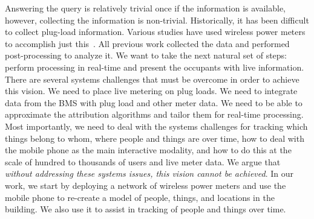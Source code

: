 Answering the query is relatively trivial once if the information is available, however, collecting the information
is non-trivial.  Historically, it has been difficult to collect plug-load information.
Various studies have used wireless power meters to accomplish just this~\cite{stephscale, lanz, aceee}.
All previous work collected the data and performed post-processing to analyze it.  We want to take the next
natural set of steps: perform processing in real-time and present the occupants with live information.  
There are several systems challenges that must be overcome in order to achieve this vision.  We need to 
place live metering on plug loads.  We need to integrate data from the BMS with plug load and other
meter data.  We need to be able to approximate the attribution algorithms and tailor them for real-time processing.
Most importantly, we need to deal with the systems challenges for tracking which things belong to whom, where people
and things are over time, how to deal with the mobile phone as the main interactive modality, and how to do this at the scale of 
hundred to thousands of users and live meter data.  We argue that \emph{without addressing these systems issues, this
vision cannot be achieved}.  In our work, we start by deploying a network of wireless power meters and use the mobile
phone to re-create a model of people, things, and locations in the building.  We also use it to assist in tracking of 
people and things over time.

